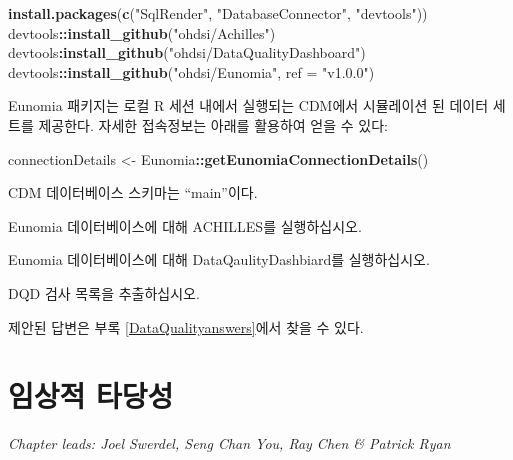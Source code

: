 \documentclass[11pt]{book}
\newenvironment{Shaded}{\begin{snugshade}}{\end{snugshade}}
\newcommand{\KeywordTok}[1]{\textcolor[rgb]{0.13,0.29,0.53}{\textbf{#1}}}
\newcommand{\DataTypeTok}[1]{\textcolor[rgb]{0.13,0.29,0.53}{#1}}
\newcommand{\StringTok}[1]{\textcolor[rgb]{0.31,0.60,0.02}{#1}}
\newcommand{\OperatorTok}[1]{\textcolor[rgb]{0.81,0.36,0.00}{\textbf{#1}}}
\newcommand{\NormalTok}[1]{#1}
\theoremstyle{definition}
\theoremstyle{definition}
\theoremstyle{definition}
\theoremstyle{remark}
\let\BeginKnitrBlock\begin \let\EndKnitrBlock\end
\begin{document}
\begin{Shaded}
\begin{Highlighting}[]
\KeywordTok{install.packages}\NormalTok{(}\KeywordTok{c}\NormalTok{(}\StringTok{"SqlRender"}\NormalTok{, }\StringTok{"DatabaseConnector"}\NormalTok{, }\StringTok{"devtools"}\NormalTok{))}
\NormalTok{devtools}\OperatorTok{::}\KeywordTok{install_github}\NormalTok{(}\StringTok{"ohdsi/Achilles"}\NormalTok{)}
\NormalTok{devtools}\OperatorTok{:}\KeywordTok{install_github}\NormalTok{(}\StringTok{"ohdsi/DataQualityDashboard"}\NormalTok{)}
\NormalTok{devtools}\OperatorTok{::}\KeywordTok{install_github}\NormalTok{(}\StringTok{"ohdsi/Eunomia"}\NormalTok{, }\DataTypeTok{ref =} \StringTok{"v1.0.0"}\NormalTok{)}
\end{Highlighting}
\end{Shaded}

Eunomia 패키지는 로컬 R 세션 내에서 실행되는 CDM에서 시뮬레이션 된
데이터 세트를 제공한다. 자세한 접속정보는 아래를 활용하여 얻을 수 있다:

\begin{Shaded}
\begin{Highlighting}[]
\NormalTok{connectionDetails <-}\StringTok{ }\NormalTok{Eunomia}\OperatorTok{::}\KeywordTok{getEunomiaConnectionDetails}\NormalTok{()}
\end{Highlighting}
\end{Shaded}

CDM 데이터베이스 스키마는 ``main''이다.

\BeginKnitrBlock{exercise}
\protect\hypertarget{exr:exerciseRunAchilles}{}{\label{exr:exerciseRunAchilles}
}Eunomia 데이터베이스에 대해 ACHILLES를 실행하십시오.
\EndKnitrBlock{exercise}

\BeginKnitrBlock{exercise}
\protect\hypertarget{exr:exerciseRunDQD}{}{\label{exr:exerciseRunDQD}
}Eunomia 데이터베이스에 대해 DataQaulityDashbiard를 실행하십시오.
\EndKnitrBlock{exercise}

\BeginKnitrBlock{exercise}
\protect\hypertarget{exr:exerciseViewDQD}{}{\label{exr:exerciseViewDQD} }DQD
검사 목록을 추출하십시오.
\EndKnitrBlock{exercise}

제안된 답변은 부록 \ref{DataQualityanswers}에서 찾을 수 있다.

\chapter{임상적 타당성}\label{ClinicalValidity}

\emph{Chapter leads: Joel Swerdel, Seng Chan You, Ray Chen \& Patrick
Ryan}
\end{document}
